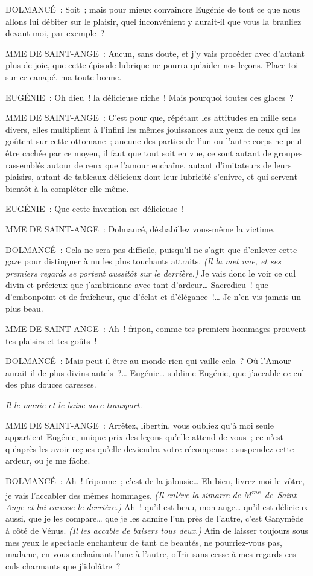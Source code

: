 \documentclass[french,twoside]{book} %
\begin{document}
DOLMANCÉ : Soit ; mais pour mieux convaincre Eugénie de tout ce que nous allons lui débiter sur le plaisir, quel inconvénient y aurait-il que vous la branliez devant moi, par exemple ?\par
MME DE SAINT-ANGE : Aucun, sans doute, et j’y vais procéder avec d’autant plus de joie, que cette épisode lubrique ne pourra qu’aider nos leçons. Place-toi sur ce canapé, ma toute bonne.\par
EUGÉNIE : Oh dieu ! la délicieuse niche ! Mais pourquoi toutes ces glaces ?\par
MME DE SAINT-ANGE : C’est pour que, répétant les attitudes en mille sens divers, elles multiplient à l’infini les mêmes jouissances aux yeux de ceux qui les goûtent sur cette ottomane ; aucune des parties de l’un ou l’autre corps ne peut être cachée par ce moyen, il faut que tout soit en vue, ce sont autant de groupes rassemblés autour de ceux que l’amour enchaîne, autant d’imitateurs de leurs plaisirs, autant de tableaux délicieux dont leur lubricité s’enivre, et qui servent bientôt à la compléter elle-même.\par
EUGÉNIE : Que cette invention est délicieuse !\par
MME DE SAINT-ANGE : Dolmancé, déshabillez vous-même la victime.\par
DOLMANCÉ : Cela ne sera pas difficile, puisqu’il ne s’agit que d’enlever cette gaze pour distinguer à nu les plus touchants attraits. {\itshape (Il la met nue, et ses premiers regards se portent aussitôt sur le derrière.)} Je vais donc le voir ce cul divin et précieux que j’ambitionne avec tant d’ardeur… Sacredieu ! que d’embonpoint et de fraîcheur, que d’éclat et d’élégance !… Je n’en vis jamais un plus beau.\par
MME DE SAINT-ANGE : Ah ! fripon, comme tes premiers hommages prouvent tes plaisirs et tes goûts !\par
DOLMANCÉ : Mais peut-il être au monde rien qui vaille cela ? Où l’Amour aurait-il de plus divins autels ?… Eugénie… sublime Eugénie, que j’accable ce cul des plus douces caresses.\par
{\itshape Il le manie et le baise avec transport.}\par
MME DE SAINT-ANGE : Arrêtez, libertin, vous oubliez qu’à moi seule appartient Eugénie, unique prix des leçons qu’elle attend de vous ; ce n’est qu’après les avoir reçues qu’elle deviendra votre récompense : suspendez cette ardeur, ou je me fâche.\par
DOLMANCÉ : Ah ! friponne ; c’est de la jalousie… Eh bien, livrez-moi le vôtre, je vais l’accabler des mêmes hommages. {\itshape (Il enlève la simarre de M\textsuperscript{me} de Saint-Ange et lui caresse le derrière.)} Ah ! qu’il est beau, mon ange… qu’il est délicieux aussi, que je les compare… que je les admire l’un près de l’autre, c’est Ganymède à côté de Vénus. {\itshape (Il les accable de baisers tous deux.)} Afin de laisser toujours sous mes yeux le spectacle enchanteur de tant de beautés, ne pourriez-vous pas, madame, en vous enchaînant l’une à l’autre, offrir sans cesse à mes regards ces culs charmants que j’idolâtre ?\par
\end{document}

